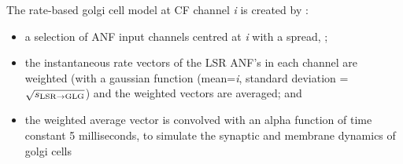 The rate-based golgi cell model at CF channel \emph{i} is created by :
\begin{itemize}
\item a selection of ANF input channels centred at \emph{i} with a spread,
  \sLSRGLG;
\item the instantaneous rate vectors of the LSR ANF's in each channel are
  weighted (with a gaussian function (mean=\emph{i}, standard deviation =
  $\sqrt{\protect s_{\protect\textrm{{LSR}}\to\textrm{{GLG}}}}$) and the weighted vectors are averaged; and
\item the weighted average vector is convolved with an alpha function of time
  constant 5 milliseconds, to simulate the synaptic and membrane dynamics of golgi cells
\end{itemize}







